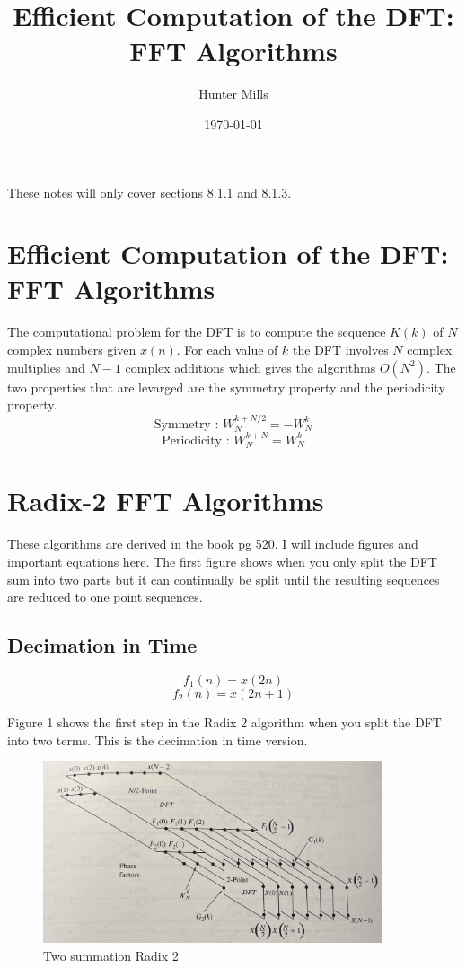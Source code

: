 \documentclass{article} %
\title{Efficient Computation of the DFT: FFT Algorithms} %
\author{Hunter Mills} %
\date{\today} %
\begin{document}
    \maketitle %
    These notes will only cover sections 8.1.1 and 8.1.3.\\
    
    \section{Efficient Computation of the DFT: FFT Algorithms} %
	The computational problem for the DFT is to compute the sequence $K(k)$ of $N$ complex numbers given $x(n)$. For each value of $k$ the DFT involves $N$ complex multiplies and $N-1$ complex additions which gives the algorithms $O(N^2)$. The two properties that are levarged are the symmetry property and the periodicity property.
	\begin{equation}
	\text{Symmetry : } W_N^{k+N/2} = -W_N^k
	\end{equation}
	\begin{equation}
	\text{Periodicity : } W_N^{k+N} = W_N^k
	\end{equation}
	
	\section{Radix-2 FFT Algorithms}
	These algorithms are derived in the book pg 520. I will include figures and important equations here. The first figure shows when you only split the DFT sum into two parts but it can continually be split until the resulting sequences are reduced to one point sequences. 
	\subsection{Decimation in Time}
	\begin{equation}
	f_1(n) = x(2n)
	\end{equation}
	\begin{equation}
	f_2(n) = x(2n + 1)
	\end{equation}
	
	Figure 1 shows the first step in the Radix 2 algorithm when you split the DFT into two terms. This is the decimation in time version. 
	
	\begin{figure}[h]
	\centering
	\includegraphics[width=10cm]{first_2}
	\caption{Two summation Radix 2}
	\end{figure}
	
\end{document}
